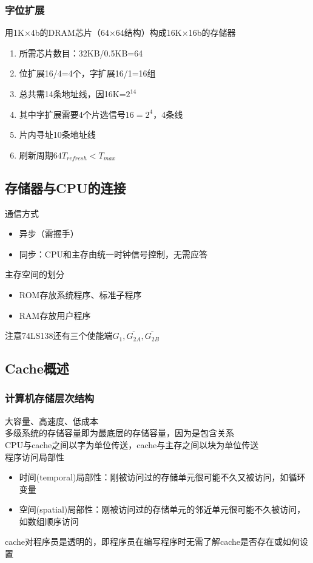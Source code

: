 \subsubsection{字位扩展}
\begin{example}
用1K$\times$4b的DRAM芯片（64$\times$64结构）构成16K$\times$16b的存储器
\end{example}
\begin{analysis}
\begin{enumerate}
	\item 所需芯片数目：32KB/0.5KB=64
	\item 位扩展16/4=4个，字扩展16/1=16组
	\item 总共需14条地址线，因16K=$2^{14}$
	\item 其中字扩展需要4个片选信号$16=2^4$，4条线
	\item 片内寻址10条地址线
	\item 刷新周期$64T_{refresh}<T_{max}$
\end{enumerate}
\end{analysis}

\subsection{存储器与CPU的连接}
通信方式
\begin{itemize}
	\item 异步（需握手）
	\item 同步：CPU和主存由统一时钟信号控制，无需应答
\end{itemize}
主存空间的划分
\begin{itemize}
	\item ROM存放系统程序、标准子程序
	\item RAM存放用户程序
\end{itemize}
注意74LS138还有三个使能端$G_1,\overline{G_{2A}},\overline{G_{2B}}$


\subsection{Cache概述}
\subsubsection{计算机存储层次结构}
大容量、高速度、低成本\\
多级系统的存储容量即为最底层的存储容量，因为是包含关系\\
CPU与cache之间以字为单位传送，cache与主存之间以块为单位传送\\
程序访问局部性
\begin{itemize}
	\item 时间(temporal)局部性：刚被访问过的存储单元很可能不久又被访问，如循环变量
	\item 空间(spatial)局部性：刚被访问过的存储单元的邻近单元很可能不久被访问，如数组顺序访问
\end{itemize}
cache对程序员是透明的，即程序员在编写程序时无需了解cache是否存在或如何设置


